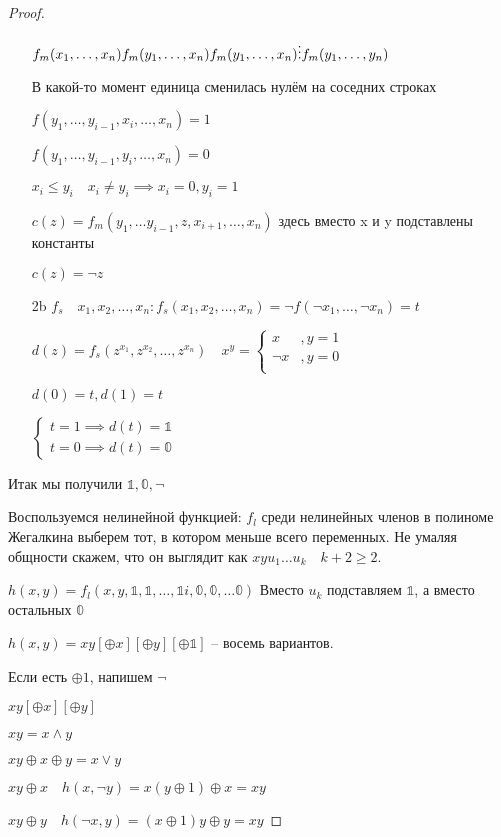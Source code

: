 \documentclass{book}
\theoremstyle{definition}
\begin{document}
\begin{proof}
\begin{itemize}
                $f_m(x_1, \ldots, x_{n} )\\f_m(y_1, \ldots, x_{n} )\\f_m(y_1, \ldots, x_{n} )\\ \vdots\\ f_m(y_1, \ldots, y_{n} )$

                В какой-то момент единица сменилась нулём на соседних строках

                $f(y_1, \ldots, y_{i-1}, x_i, \ldots, x_{n} )=1$

                $f(y_1, \ldots, y_{i-1}, y_i, \ldots, x_{n} )=0$

                $x_i\leqslant y_i\quad x_i\neq y_i \implies x_i = 0, y_i = 1$

                $c(z) = f_m(y_1, \ldots y_{i-1}, z, x_{i+1}, \ldots, x_{n} )$ здесь вместо x и y подставлены константы

                $c(z) = \neg z$
            \item [2b] $f_s\quad x_1, x_2, \ldots, x_{n} : f_s(x_1, x_2, \ldots, x_{n} ) = \neg f(\neg x_1, \ldots, \neg x_{n} ) = t$

                $d(z) = f_s(z^{x_1}, z^{x_2}, \ldots, z^{x_{n} })\quad x^y = \begin{cases}
                    x&, y=1\\
                    \neg x&, y= 0 \\
                \end{cases}$

                $d(0) = t, d(1) = t$

                $\begin{cases}
                    t=1 \implies d(t) = \mathbb{1}\\
                    t=0 \implies d(t) = \mathbb{0}
                \end{cases}$
        \end{itemize}
        Итак мы получили $\mathbb{1,0},\neg$

        Воспользуемся нелинейной функцией: $f_l$ среди нелинейных членов в полиноме Жегалкина выберем тот, в котором меньше всего переменных. Не умаляя общности скажем, что он выглядит как $xyu_1\dots u_k\quad k+2\geqslant 2$.

        $h(x,y) = f_l(x,y,\mathbb{1}, \mathbb{1}, \ldots, \mathbb{1}i, \mathbb{0}, \mathbb{0}, \ldots\mathbb{0})$ Вместо $u_k$ подставляем $\mathbb{1}$, а вместо остальных $\mathbb{0}$

        $h(x,y)= xy[\oplus x][\oplus y][\oplus \mathbb{1}]$ -- восемь вариантов.

        Если есть $\oplus 1$, напишем $\neg$

        $xy[\oplus x][\oplus y]$       

        $xy = x\land y$

        $xy\oplus x\oplus y = x\lor y$

        $xy\oplus x\quad h(x,\neg y) = x(y\oplus 1)\oplus x = xy$

        $xy\oplus y\quad h(\neg x, y) = (x\oplus 1)y\oplus y = xy$
    \end{proof}
\end{document}
